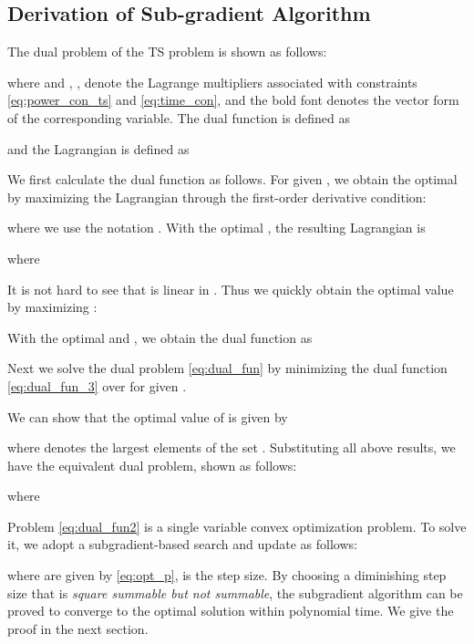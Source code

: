 \documentclass[conference]{IEEEtran}
\begin{document}
\appendix

\subsection{Derivation of Sub-gradient Algorithm}
The dual problem of the TS problem is shown as follows:

where  and , ,  denote the Lagrange multipliers associated with constraints \eqref{eq:power_con_ts} and \eqref{eq:time_con}, and the bold font denotes the vector form of the corresponding variable.  The dual function is defined as

and the Lagrangian is defined as




We first calculate the dual function as follows. For given , we obtain the optimal  by maximizing the Lagrangian  through the first-order derivative condition:

where we use the notation . With the optimal , the resulting Lagrangian is

where

It is not hard to see that  is linear in . Thus we quickly obtain the optimal value  by maximizing :

With the optimal  and , we obtain the dual function as




Next we solve the dual problem \eqref{eq:dual_fun} by minimizing the dual function \eqref{eq:dual_fun_3} over  for given .

We can show that the optimal value of  is given by

where  denotes the largest elements of the set .
Substituting all above results, we have the equivalent dual problem, shown as follows:

where


Problem \eqref{eq:dual_fun2} is a single variable convex optimization problem.
To solve it, we adopt a subgradient-based search and update  as follows:

where  are given by \eqref{eq:opt_p},  is the step size. By choosing a diminishing step size that is \emph{square summable but not summable}, the subgradient algorithm can be proved to converge to the optimal solution within polynomial time\cite{Bertsekas1999nonlinear}. We give the proof in the next section.
\end{document}
